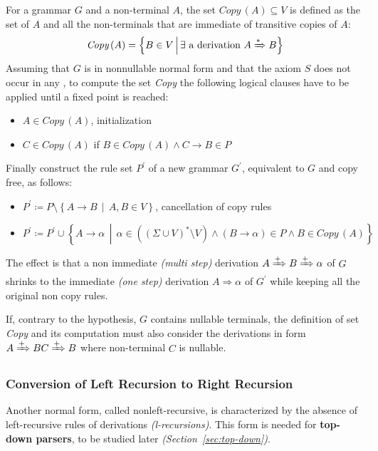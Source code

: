 \documentclass[english]{article}
\begin{document}
For a grammar \(G\) and a non-terminal \(A\), the set \(\textit{Copy}\,(A) \subseteq V\) is defined as the set of \(A\) and all the non-terminals that are immediate of transitive copies of \(A\):
\[ \textit{Copy}\,(A) = \left\{ B \in V \, \middle| \, \exists \text{ a derivation } A \xRightarrow{\ast} B \right\} \]
Assuming that \(G\) is in nonnullable normal form and that the axiom \(S\) does not occur in any \RP,
to compute the set \textit{Copy} the following logical clauses have to be applied until a fixed point is reached:
\begin{itemize}
  \item \(A \in \textit{Copy}\,(A)\), initialization
  \item \(C \in \textit{Copy}\,(A)\) if \(B \in \textit{Copy}\,(A) \land C \rightarrow B \in P\)
\end{itemize}
Finally construct the rule set \(P^\prime\) of a new grammar \(G^\prime\), equivalent to \(G\) and copy free, as follows:
\begin{itemize}
  \item \(P^\prime \coloneqq P \setminus \left\{ A \rightarrow B \, \middle| \, A, B \in V \right\}\), cancellation of copy rules
  \item \(P^\prime \coloneqq P^\prime \cup \left\{ A \rightarrow \alpha \, \middle| \, \alpha \in \left( \left( \Sigma \cup V \right)^\ast \setminus V \right) \land \left( B \rightarrow \alpha \right) \in P \land B \in \textit{Copy}\,(A) \right\}\)
\end{itemize}

The effect is that a non immediate \textit{(multi step)} derivation \(A \xRightarrow{+} B \xRightarrow{+} \alpha\) of \(G\) shrinks to the immediate \textit{(one step)} derivation \(A \Rightarrow \alpha\) of \(G^\prime\) while keeping all the original non copy rules.

\bigskip
If, contrary to the hypothesis, \(G\) contains nullable terminals, the definition of set \textit{Copy} and its computation must also consider the derivations in form \(A \xRightarrow{+} BC \xRightarrow{+} B\) where non-terminal \(C\) is nullable.

\subsubsection{Conversion of Left Recursion to Right Recursion}
\label{sec:conversion-of-left-recursion-to-right-recursion}

Another normal form, called nonleft-recursive, is characterized by the absence of left-recursive rules of derivations \textit{(l-recursions)}.
This form is needed for \textbf{top-down parsers}, to be studied later \textit{(Section~\ref{sec:top-down})}.
\end{document}
